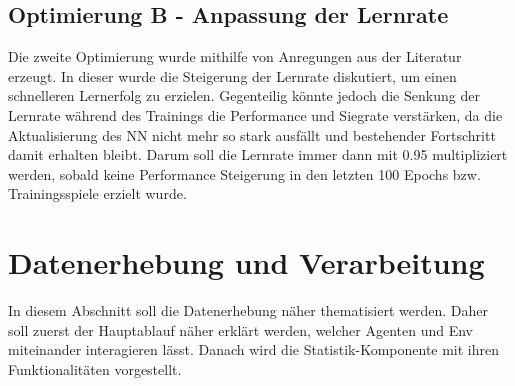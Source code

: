 \subsection{Optimierung B - Anpassung der Lernrate} \label{subsec:Konzept_Optimierung02}
Die zweite Optimierung wurde mithilfe von Anregungen aus der Literatur \cite[S. 331 f.]{DRL_Lapan} erzeugt. In dieser wurde die Steigerung der Lernrate diskutiert, um einen schnelleren Lernerfolg zu erzielen. Gegenteilig könnte jedoch die Senkung der Lernrate während des Trainings die Performance und Siegrate verstärken, da die Aktualisierung des NN nicht mehr so stark ausfällt und bestehender Fortschritt damit erhalten bleibt. Darum soll die Lernrate immer dann mit 0.95 multipliziert werden, sobald keine Performance Steigerung in den letzten 100 Epochs bzw. Trainingsspiele erzielt wurde.

\section{Datenerhebung und Verarbeitung} \label{sec:Konzept_Datenerhebung_Verarbeitung}
In diesem Abschnitt soll die Datenerhebung näher thematisiert werden. Daher soll zuerst der Hauptablauf näher erklärt werden, welcher Agenten und Env miteinander interagieren lässt. Danach wird die Statistik-Komponente mit ihren Funktionalitäten vorgestellt.

